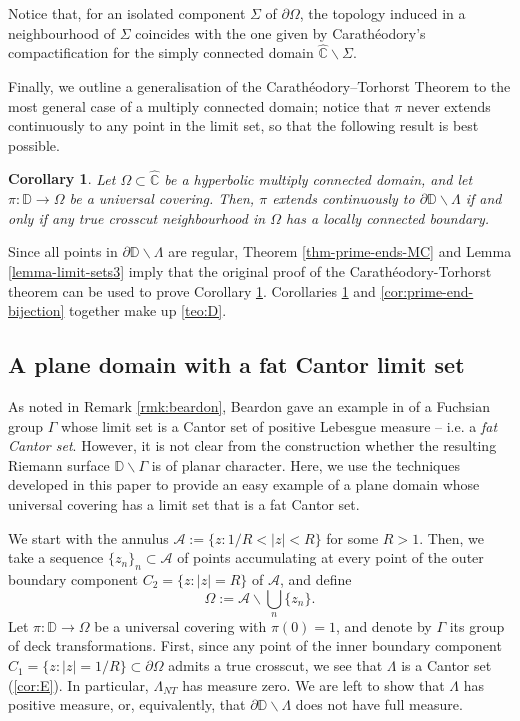 \documentclass[11pt,a4paper,reqno]{amsart}
\theoremstyle{plain}
\newtheorem{cor}[thm]{Corollary}
\theoremstyle{definition}
\theoremstyle{plain}
\def\DD{\mathbb{D}}
\renewcommand{\setminus}{\smallsetminus}
\begin{document}
Notice that, for an isolated component $ \Sigma $ of $ \partial\Omega $, the topology induced in a neighbourhood of  $ \Sigma $ coincides with the one given by Carathéodory's  compactification for the simply connected domain $ \widehat{\mathbb{C}}\smallsetminus \Sigma $.

Finally, we outline a generalisation of the Carath\'eodory--Torhorst Theorem to the most general case of a multiply connected domain; notice that $\pi$ never extends continuously to any point in the limit set, so that the following result is best possible.

\begin{cor}\label{cor:CT-MC}
	Let $\Omega\subset\widehat{\mathbb{C}}$ be a hyperbolic multiply connected domain, and let $\pi\colon\DD\to\Omega$ be a universal covering. Then, $\pi$ extends continuously to $\partial\DD\setminus\Lambda$ if and only if any true crosscut neighbourhood in $\Omega$ has a locally connected boundary.
\end{cor}

Since all points in $\partial\DD\smallsetminus\Lambda$ are regular, Theorem \ref{thm-prime-ends-MC} and Lemma \ref{lemma-limit-sets3} imply that the original proof of the Carathéodory-Torhorst theorem can be used to prove Corollary \ref{cor:CT-MC}. Corollaries \ref{cor:CT-MC} and \ref{cor:prime-end-bijection} together make up  \ref{teo:D}.

\subsection{A plane domain with a fat Cantor limit set}\label{ssec:group-examples}
As noted in Remark \ref{rmk:beardon}, Beardon gave an example in \cite{Bea71} of a Fuchsian group $\Gamma$ whose limit set is a Cantor set of positive Lebesgue measure -- i.e. a {\em fat Cantor set}. However, it is not clear from the construction whether the resulting Riemann surface $\DD\setminus\Gamma$ is of planar character. Here, we use the techniques developed in this paper to provide an easy example of a plane domain whose universal covering has a limit set that is a fat Cantor set.

We start with the annulus $\mathcal{A} := \{z\colon 1/R < |z| < R\}$ for some $R > 1$. Then, we take a sequence $\{z_n\}_n\subset \mathcal{A}$ of points accumulating at every point of the outer boundary component $C_2 = \{z\colon |z| = R\}$ of $\mathcal{A}$, and define 
\[ \Omega := \mathcal{A}\setminus\bigcup_n \{z_n\}. \]
Let $\pi\colon\DD\to\Omega$ be a universal covering with $\pi(0) = 1$, and denote by $\Gamma$ its group of deck transformations. First, since any point of the inner boundary component $C_1 = \{z\colon |z| = 1/R\}\subset\partial\Omega$ admits a true crosscut, we see that  $\Lambda$ is a Cantor set (\ref{cor:E}). In particular, $\Lambda_{NT}$ has measure zero. We are left to show that $ \Lambda $ has positive measure, or, equivalently, that $\partial\DD\setminus\Lambda$ does not have full measure.
\end{document}
